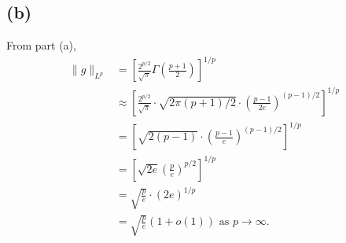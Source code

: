 \subsection*{(b)}
From part (a), 
\begin{align*}
	\lVert g \rVert_{L^p} 
	&= \left[ \frac{2^{p/2}}{\sqrt{\pi}} \Gamma \left( \frac{p + 1}{2} \right) \right]^{1/p} \\
	&\approx \left[ \frac{2^{p/2}}{\sqrt{\pi}} \cdot \sqrt{2 \pi(p + 1) / 2} \cdot 
	\left( \frac{p - 1}{2e} \right)^{(p - 1)/2} \right]^{1/p} \\
	&= \left[ \sqrt{2(p - 1)} \cdot \left( \frac{p - 1}{e} \right)^{(p-1)/2} \right]^{1/p} \\
	&= \left[ \sqrt{2e} \left( \frac{p}{e} \right)^{p/2} \right]^{1/p} \\
	&= \sqrt{\frac{p}{e}} \cdot (2e)^{1/p} \\
	&= \sqrt{\frac{p}{e}} (1 + o(1)) \text{ as } p \to \infty.
\end{align*}

